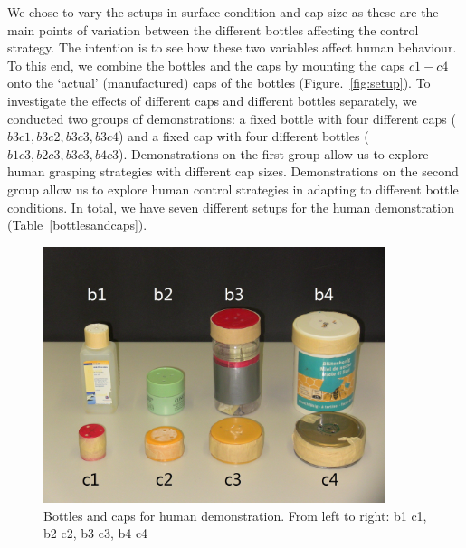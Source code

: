 We chose to vary the setups in surface condition and cap size as these
are the main points of variation between the different bottles
affecting the control strategy. The intention is to see how these two
variables affect human behaviour. To this end, we combine the bottles
and the caps by mounting the caps $c1-c4$ onto the `actual'
(manufactured) caps of the bottles (Figure.~\ref{fig:setup}). To
investigate the effects of different caps and different bottles
separately, we conducted two groups of demonstrations: a fixed bottle with
four different caps ($b3c1, b3c2, b3c3, b3c4$) and a fixed cap with four
different bottles ($b1c3, b2c3, b3c3, b4c3$). Demonstrations on the
first group allow us to explore human grasping strategies with
different cap sizes. Demonstrations on the second group allow us to
explore human control strategies in adapting to different bottle
conditions. In total, we have seven different setups for the human
demonstration (Table~\ref{bottlesandcaps}).


\begin{figure}
  \centering
  \includegraphics[width=10cm]{./fig_cha4/b_c.jpg}
  \caption{  {Bottles and caps for human demonstration. From left to right: b1 c1, b2 c2, b3 c3, b4  c4}
}
\label{fig:b_c}
\end{figure}






